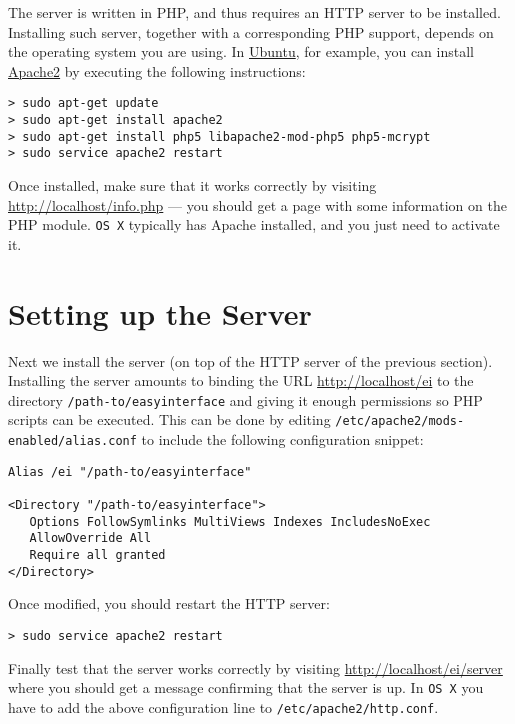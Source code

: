 The \ei server is written in PHP, and thus requires an HTTP server to
be installed. Installing such server, together with a corresponding
PHP support, depends on the operating system you are using. 
%
In \href{http://www.ubuntu.com}{Ubuntu}, for example, you can install
\href{http://httpd.apache.org/}{Apache2} by executing the following
instructions:

\medskip
\begin{lstlisting}
> sudo apt-get update
> sudo apt-get install apache2
> sudo apt-get install php5 libapache2-mod-php5 php5-mcrypt
> sudo service apache2 restart
\end{lstlisting}

\medskip
\noindent
Once installed, make sure that it works correctly by visiting
\url{http://localhost/info.php} --- you should get a page with some
information on the PHP module.
%
\texttt{OS X} typically has Apache installed, and you just need to
activate it.

\section{Setting up the \ei Server}

Next we install the \ei server (on top of the HTTP server of the
previous section).
%
Installing the \ei server amounts to binding the URL
\url{http://localhost/ei} to the directory
\texttt{/path-to/easyinterface} and giving it enough permissions so PHP
scripts can be executed. This can be done by editing
\texttt{/etc/apache2/mods-enabled/alias.conf} to include the following
configuration snippet:

\medskip
\noindent
\begin{lstlisting}
Alias /ei "/path-to/easyinterface"

<Directory "/path-to/easyinterface">
   Options FollowSymlinks MultiViews Indexes IncludesNoExec
   AllowOverride All
   Require all granted
</Directory>
\end{lstlisting}

\medskip
\noindent
Once modified, you should restart the HTTP server:

\medskip
\begin{lstlisting}
> sudo service apache2 restart
\end{lstlisting}

\medskip
\noindent
Finally test that the \ei server works correctly by visiting
\url{http://localhost/ei/server} where you should get a message
confirming that the server is up.
%
In \texttt{OS X} you have to add the above configuration line to
\texttt{/etc/apache2/http.conf}. 


